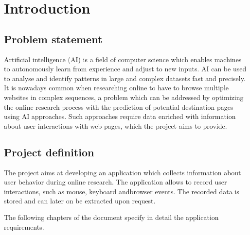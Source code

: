 \chapter{Introduction}
\label{ch:introduction}

\section{Problem statement}
Artificial intelligence (AI) is a field of computer science which enables machines to autonomously learn from experience and adjust to new inputs. AI can be used to analyse and identify patterns in large and complex datasets fast and precisely. It is nowadays common when researching online to have to browse multiple websites in complex sequences, a problem which can be addressed by optimizing the online research process with the prediction of potential destination pages using AI approaches. Such approaches require data enriched with information about user interactions with web pages, which the project aims to provide.


\section{Project definition}
The project aims at developing an application which collects information about \gls{user} behavior during online research. The application allows to record \gls{user} interactions, such as mouse, keyboard and\gls{browser} events. The recorded data is stored and can later on be extracted upon request. 

The following chapters of the document specify in detail the application requirements.
